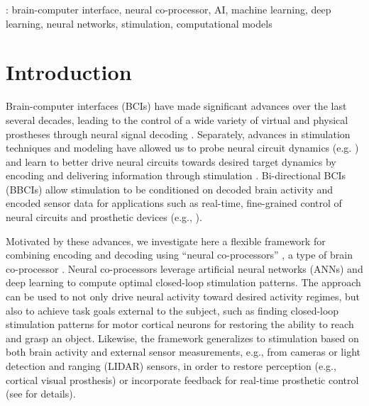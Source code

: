 \documentclass[12pt]{iopart}
\begin{document}
\vspace{2pc}
: brain-computer interface, neural co-processor, AI, machine learning, deep learning, neural networks, stimulation, computational models
%
%
\maketitle
% 
%



\section{Introduction}
Brain-computer interfaces (BCIs) have made significant advances over the last several decades, leading
to the control of a wide variety of virtual and physical prostheses through neural signal decoding
\cite{rao.bcibook, wolpaw.bcibook, moritz.neuro, lebedev.bmi}. Separately, advances in stimulation techniques and modeling have allowed
us to probe neural circuit dynamics (e.g. \cite{walker.inception}) and learn to better drive neural
circuits towards desired target dynamics by encoding and delivering information through
stimulation \cite{niparko.cochlear, weiland.retinal, tomlinson.propr, tabot.tact, tyler.tact,
dadarlat.tact, sharlene.tact, cronin.tact}. Bi-directional BCIs (BBCIs) allow stimulation to be
conditioned on decoded brain activity and encoded sensor data for applications such as real-time,
fine-grained control of neural circuits and prosthetic devices (e.g., \cite{nicolelis.bmbi}).

Motivated by these advances, we investigate here a flexible framework for combining encoding
and decoding using ``neural co-processors'' \cite{rao.coproc}, a type of brain co-processor \cite{rao.braincoproc}. Neural co-processors leverage artificial neural networks (ANNs) and deep
learning to compute optimal closed-loop stimulation patterns. The approach can be used to not only drive neural activity
toward desired activity regimes, but also to achieve task goals external to the subject, such as finding closed-loop
stimulation patterns for motor cortical neurons for restoring the ability to reach and grasp an object. Likewise, the
framework generalizes to stimulation based on both brain activity and external sensor measurements, e.g., from cameras or
light detection and ranging (LIDAR) sensors, in order to restore perception (e.g., cortical visual prosthesis) or
incorporate feedback for real-time prosthetic control (see \cite{rao.braincoproc} for details).
\end{document}
